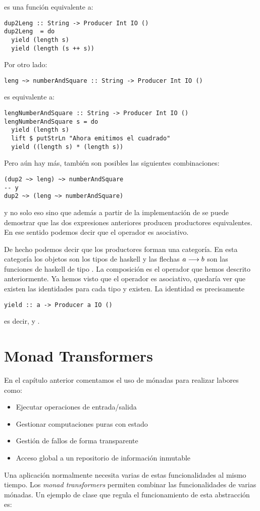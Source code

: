 es una función equivalente a:
\begin{verbatim}
dup2Leng :: String -> Producer Int IO ()
dup2Leng  = do
  yield (length s)
  yield (length (s ++ s))
\end{verbatim}
Por otro lado:
\begin{verbatim}
leng ~> numberAndSquare :: String -> Producer Int IO ()
\end{verbatim}
es equivalente a:
\begin{verbatim}
lengNumberAndSquare :: String -> Producer Int IO ()
lengNumberAndSquare s = do
  yield (length s)
  lift $ putStrLn "Ahora emitimos el cuadrado"
  yield ((length s) * (length s))
\end{verbatim}
Pero aún hay más, también son posibles las siguientes combinaciones:
\begin{verbatim}
(dup2 ~> leng) ~> numberAndSquare
-- y
dup2 ~> (leng ~> numberAndSquare)
\end{verbatim}
y no solo eso sino que además a partir de la implementación de
 se puede demostrar que las dos expresiones anteriores
producen productores equivalentes. En ese sentido
podemos decir que el operador
\cod{\pcomp >} es asociativo.

De hecho podemos decir que los productores forman una categoría.
En esta categoría los objetos son los tipos de haskell y las flechas
$a\longrightarrow b$ son las funciones de haskell de tipo
. La composición es el operador
\cod{\pcomp >} que hemos descrito anteriormente. Ya hemos visto que el operador
es asociativo, quedaría ver que existen las identidades para cada
tipo y existen. La identidad es precisamente
\begin{verbatim}
yield :: a -> Producer a IO ()
\end{verbatim}
es decir,  y .

\section{Monad Transformers}
En el capítulo anterior comentamos el uso de mónadas para realizar
labores como:
\begin{itemize}
\item Ejecutar operaciones de entrada/salida
\item Gestionar computaciones puras con estado
\item Gestión de fallos de forma transparente
\item Acceso global a un repositorio de información inmutable
\end{itemize}
Una aplicación normalmente necesita varias de estas funcionalidades
al mismo tiempo. Los \textit{monad transformers} permiten combinar
las funcionalidades de varias mónadas. Un ejemplo de clase que
regula el funcionamiento de esta abstracción es:

